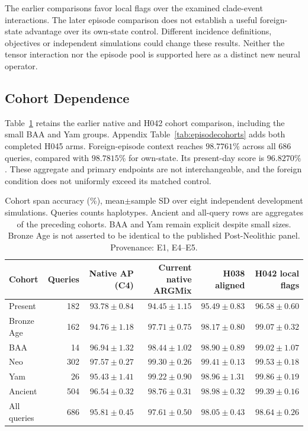 \documentclass[letterpaper]{article}
\begin{document}
The earlier comparisons favor local flags over the examined clade-event interactions. The later episode comparison does not establish a useful foreign-state advantage over its own-state control. Different incidence definitions, objectives or independent simulations could change these results. Neither the tensor interaction nor the episode pool is supported here as a distinct new neural operator.

\subsection{Cohort Dependence}
Table~\ref{tab:cohorts} retains the earlier native and H042 cohort comparison, including the small BAA and Yam groups. Appendix Table~\ref{tab:episodecohorts} adds both completed H045 arms. Foreign-episode context reaches $98.7761\%$ across all 686 queries, compared with $98.7815\%$ for own-state. Its present-day score is $96.8270\%$. These aggregate and primary endpoints are not interchangeable, and the foreign condition does not uniformly exceed its matched control.

\begin{table}[t]
\centering
\small
\begin{tabular}{lrrrrr}
\toprule
Cohort & Queries & Native AP (C4) & Current native ARGMix & H038 aligned & H042 local flags \\
\midrule
Present & 182 & $93.78\pm0.84$ & $94.45\pm1.15$ & $95.49\pm0.83$ & $96.58\pm0.60$ \\
Bronze Age & 162 & $94.76\pm1.18$ & $97.71\pm0.75$ & $98.17\pm0.80$ & $99.07\pm0.32$ \\
BAA & 14 & $96.94\pm1.32$ & $98.44\pm1.02$ & $98.90\pm0.89$ & $99.02\pm1.07$ \\
Neo & 302 & $97.57\pm0.27$ & $99.30\pm0.26$ & $99.41\pm0.13$ & $99.53\pm0.18$ \\
Yam & 26 & $95.43\pm1.41$ & $99.22\pm0.90$ & $98.96\pm1.31$ & $99.86\pm0.19$ \\
Ancient & 504 & $96.54\pm0.32$ & $98.76\pm0.31$ & $98.98\pm0.32$ & $99.39\pm0.16$ \\
All queries & 686 & $95.81\pm0.45$ & $97.61\pm0.50$ & $98.05\pm0.43$ & $98.64\pm0.26$ \\
\bottomrule
\end{tabular}
\caption{Cohort span accuracy (\%), mean$\pm$sample SD over eight independent development simulations. Queries counts haplotypes. Ancient and all-query rows are aggregates of the preceding cohorts. BAA and Yam remain explicit despite small sizes. Bronze Age is not asserted to be identical to the published Post-Neolithic panel. Provenance: E1, E4--E5.}
\label{tab:cohorts}
\end{table}
\end{document}

